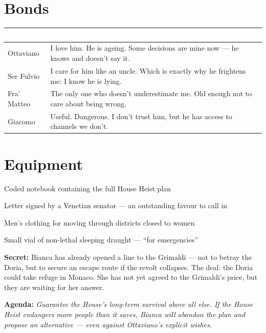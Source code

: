 \section*{Bonds}
\begin{table}[h]
\centering\renewcommand{\arraystretch}{1.4}
\begin{tabularx}{\linewidth}{@{}L{2.4cm} X@{}}
  \toprule{}
  \textcolor{white}{\textbf{PC}} & \textcolor{white}{\textbf{Bond}} \\
  \midrule
  Ottaviano & I love him. He is ageing. Some decisions are mine now --- he knows and doesn't say it. \\
  Ser Fulvio & I care for him like an uncle. Which is exactly why he frightens me: I know he is lying. \\
  Fra' Matteo & The only one who doesn't underestimate me. Old enough not to care about being wrong. \\
  Giacomo & Useful. Dangerous. I don't trust him, but he has access to channels we don't. \\
  \bottomrule
\end{tabularx}
\end{table}

\section*{Equipment}
\begin{goldlist}
  \item Coded notebook containing the full House Heist plan
  \item Letter signed by a Venetian senator --- an outstanding favour to call in
  \item Men's clothing for moving through districts closed to women
  \item Small vial of non-lethal sleeping draught --- ``for emergencies''
\end{goldlist}

\clearpage

\begin{secretbox}
  \textbf{Secret:} Bianca has already opened a line to the Grimaldi --- not to
  betray the Doria, but to secure an escape route if the revolt collapses. The deal:
  the Doria could take refuge in Monaco. She has not yet agreed to the Grimaldi's
  price, but they are waiting for her answer.

  \medskip\noindent\textcolor{SecretRed}{\textbf{Agenda:}}
  \textit{Guarantee the House's long-term survival above all else. If the House Heist
  endangers more people than it saves, Bianca will abandon the plan and propose an
  alternative --- even against Ottaviano's explicit wishes.}
\end{secretbox}

